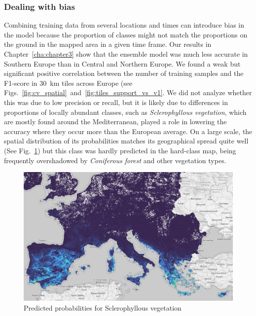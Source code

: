         \subsubsection{Dealing with bias}
        Combining training data from several locations and times can introduce bias in the model because the proportion of classes might not match the proportions on the ground in the mapped area in a given time frame. Our results in Chapter\@~\ref{cha:chapter3} show that the ensemble model was much less accurate in Southern Europe than in Central and Northern Europe. We found a weak but significant positive correlation between the number of training samples and the F1-score in 30~km tiles across Europe (see Figs.\@~\ref{fig:cv_spatial}\@~and\@~\ref{fig:tiles_support_vs_v1}. We did not analyze whether this was due to low precision or recall, but it is likely due to differences in proportions of locally abundant classes, such as \textit{Sclerophyllous vegetation}, which are mostly found around the Mediterranean, played a role in lowering the accuracy where they occur more than the European average. On a large scale, the spatial distribution of its probabilities matches its geographical spread quite well (See Fig.\@~\ref{fig:sclerophyllous}) but this class was hardly predicted in the hard-class map, being frequently overshadowed by \textit{Coniferous forest} and other vegetation types.  

        \begin{figure}[H]
        \centering
        \includegraphics[width=1\linewidth]{figs_06/sclerophyllous.png}
        \caption{Predicted probabilities for Sclerophyllous vegetation}
        \label{fig:sclerophyllous}
        \end{figure}
        
